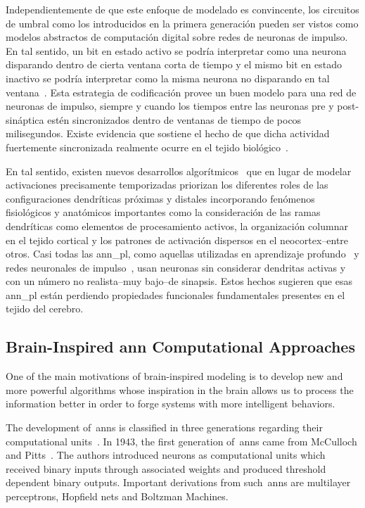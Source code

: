 {Independientemente de que este enfoque de modelado es convincente, los circuitos de umbral como los introducidos en la primera generación pueden ser vistos como modelos abstractos de computación digital sobre redes de neuronas de impulso.
En tal sentido, un bit en estado activo se podría interpretar como una neurona disparando dentro de cierta ventana corta de tiempo y el mismo bit en estado inactivo se podría interpretar como la misma neurona no disparando en tal ventana~\cite{Valiant:1994:CM:199266}.
Esta estrategia de codificación provee un buen modelo para una red de neuronas de impulso, siempre y cuando los tiempos entre las neuronas pre y post-sináptica estén sincronizados dentro de ventanas de tiempo de pocos milisegundos.
Existe evidencia que sostiene el hecho de que dicha actividad fuertemente sincronizada realmente ocurre en el tejido biológico~\cite{Abeles1993SpatiotemporalFP,bair1994}.

En tal sentido, existen nuevos desarrollos algorítmicos~\cite{10.3389/fncir.2016.00023,10.1371/journal.pone.0217966} que en lugar de modelar activaciones precisamente temporizadas priorizan los diferentes roles de las configuraciones dendríticas próximas y distales incorporando fenómenos fisiológicos y anatómicos importantes como la consideración de las ramas dendríticas como elementos de procesamiento activos, la organización columnar en el tejido cortical y los patrones de activación dispersos en el neocortex--entre otros.
Casi todas las \gls{ann_pl}, como aquellas utilizadas en aprendizaje profundo~\cite{lecun_deep_2015} y redes neuronales de impulso~\cite{MAASS19971659}, usan neuronas sin considerar dendritas activas y con un número no realista--muy bajo--de sinapsis.
Estos hechos sugieren que esas \gls{ann_pl} están perdiendo propiedades funcionales fundamentales presentes en el tejido del cerebro.
}{
\subsection{Brain-Inspired \gls{ann} Computational Approaches}

One of the main motivations of brain-inspired modeling is to develop new and more powerful algorithms whose inspiration in the brain allows us to process the information better in order to forge systems with more intelligent behaviors.

The development of~\glspl{ann} is classified in three generations regarding their computational units~\cite{MAASS19971659,10.1007/978-3-642-03156-4_17}. In 1943, the first generation of~\glspl{ann} came from McCulloch and Pitts~\cite{McCulloch1990ALC}. The authors introduced neurons as computational units which received binary inputs through associated weights and produced threshold dependent binary outputs. Important derivations from such~\glspl{ann} are multilayer perceptrons, Hopfield nets and Boltzman Machines.

}

